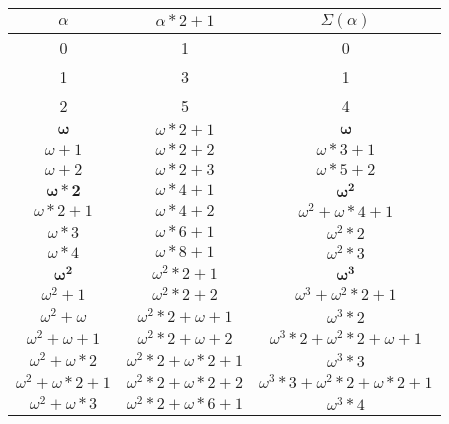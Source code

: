 \documentclass[oneside,12pt]{amsart}
\begin{document}
\begin{tabular}{|c|c|c|}
\hline $\alpha$ & $\alpha*2+1$ & $\Sigma(\alpha)$ \\ \hline \hline
0 & 1 & 0 \\ \hline
1 & 3 & 1 \\ \hline
2 & 5 & 4 \\ \hline \hline

$\boldsymbol{\omega}$ & $\omega*2+1$ & $\boldsymbol{\omega}$ \\ \hline
$\omega + 1$ & $\omega*2+2$ & $\omega*3 + 1$ \\ \hline
$\omega + 2$ & $\omega*2+3$ & $\omega*5 + 2$ \\ \hline \hline

$\boldsymbol{\omega*2}$ & $\omega*4+1$ & $\boldsymbol{\omega^2}$ \\ \hline
$\omega*2 + 1$ & $\omega*4+2$ & $\omega^2 + \omega*4+1$ \\ \hline \hline

$\omega*3$ & $\omega*6+1$ & $\omega^2 *2$ \\ \hline \hline

$\omega*4$ & $\omega*8+1$ & $\omega^2 *3$ \\ \hline \hline

$\boldsymbol{\omega^2}$ & $\omega^2*2+1$ & $\boldsymbol{\omega^3}$ \\ \hline
$\omega^2 + 1$ & $\omega^2*2+2$ & $\omega^3 + \omega^2*2+1$ \\ \hline \hline

$\omega^2 + \omega$ & $\omega^2*2+\omega + 1$ & $\omega^3 * 2$ \\ \hline
$\omega^2 + \omega + 1$ & $\omega^2*2+ \omega + 2$ & $\omega^3*2 + \omega^2*2+\omega + 1$ \\ \hline \hline

$\omega^2 + \omega*2$ & $\omega^2*2+\omega*2 + 1$ & $\omega^3 * 3$ \\ \hline

$\omega^2 + \omega*2 + 1$ & $\omega^2*2+\omega*2 + 2$ & $\omega^3 * 3 + \omega^2*2+\omega*2 + 1$ \\ \hline \hline

$\omega^2  + \omega * 3$ & $\omega^2*2+ \omega*6 + 1$ & $\omega^3 * 4$ \\ \hline \hline


\end{tabular}
\end{document}
